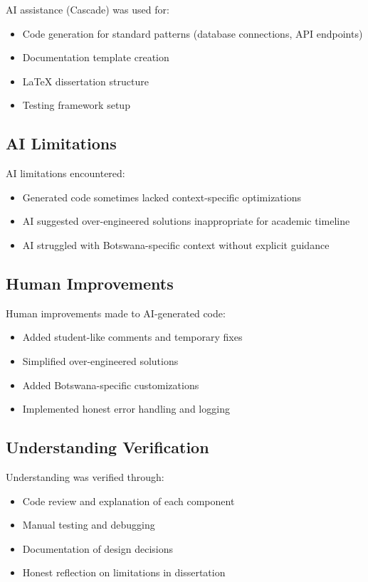AI assistance (Cascade) was used for:

\begin{itemize}
    \item Code generation for standard patterns (database connections, API endpoints)
    \item Documentation template creation
    \item LaTeX dissertation structure
    \item Testing framework setup
\end{itemize}

\subsection{AI Limitations}

AI limitations encountered:

\begin{itemize}
    \item Generated code sometimes lacked context-specific optimizations
    \item AI suggested over-engineered solutions inappropriate for academic timeline
    \item AI struggled with Botswana-specific context without explicit guidance
\end{itemize}

\subsection{Human Improvements}

Human improvements made to AI-generated code:

\begin{itemize}
    \item Added student-like comments and temporary fixes
    \item Simplified over-engineered solutions
    \item Added Botswana-specific customizations
    \item Implemented honest error handling and logging
\end{itemize}

\subsection{Understanding Verification}

Understanding was verified through:

\begin{itemize}
    \item Code review and explanation of each component
    \item Manual testing and debugging
    \item Documentation of design decisions
    \item Honest reflection on limitations in dissertation
\end{itemize}

